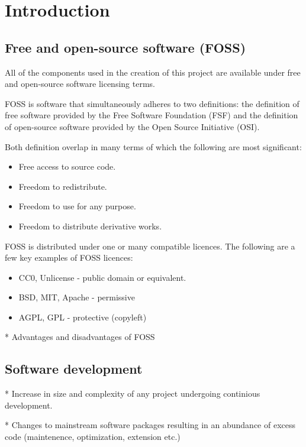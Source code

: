 \section{Introduction}\label{Introduction}

\subsection{Free and open-source software (FOSS)}

All of the components used in the creation of this project are available under free and open-source software licensing terms.

FOSS is software that simultaneously adheres to two definitions: the definition of free software provided by the Free Software Foundation (FSF) and the definition of open-source software provided by the Open Source Initiative (OSI).

Both definition overlap in many terms of which the following are most significant:

\begin{itemize}
    \item Free access to source code.
    \item Freedom to redistribute.
    \item Freedom to use for any purpose.
    \item Freedom to distribute derivative works.
\end{itemize}

FOSS is distributed under one or many compatible licences. The following are a few key examples of FOSS licences:

\begin{itemize}
    \item CC0, Unlicense - public domain or equivalent.
    \item BSD, MIT, Apache - permissive
    \item AGPL, GPL - protective (copyleft)
\end{itemize}

* Advantages and disadvantages of FOSS

\subsection{Software development}

* Increase in size and complexity of any project undergoing continious development.

* Changes to mainstream software packages resulting in an abundance of excess code (maintenence, optimization, extension etc.)

